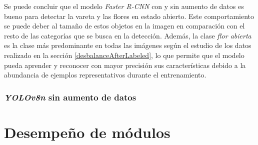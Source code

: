 Se puede concluir que el modelo \textit{Faster R-CNN} con y sin aumento de datos es bueno para detectar la vareta y las flores en estado abierto. Este comportamiento se puede deber al tamaño de estos objetos en la imagen en comparación con el resto de las categorías que se busca en la detección. Además, la clase \textit{flor abierta} es la clase más predominante en todas las imágenes según el estudio de los datos realizado en la sección \ref{desbalanceAfterLabeled}, lo que permite que el modelo pueda aprender y reconocer con mayor precisión sus características debido a la abundancia de ejemplos representativos durante el entrenamiento.

\subsubsection{\textit{YOLOv8n} sin aumento de datos}



\section{Desempeño de módulos}
\label{sec:desempeñoModulos}
